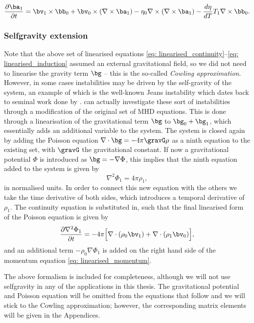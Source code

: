 {\begin{equation} \label{eq: linearised_induction}
  \frac{\partial \ba_1}{\partial t} =
    \bv_1 \times \bb_0
    + \bv_0 \times \left(\nabla \times \ba_1\right)
    - \eta_0 \nabla \times \left(\nabla \times \ba_1\right)
    - \frac{d\eta}{dT}T_1 \nabla \times \bb_0.
\end{equation}
}


\subsubsection{Selfgravity extension}
Note that the above set of linearised equations \eqref{eq: linearised_continuity}--\eqref{eq: linearised_induction} assumed an external gravitational field, so we did not need to linearise the gravity term $\bg$ -- this is the so-called \emph{Cowling approximation}. However, in some cases instabilities may be driven by the self-gravity of the system, an example of which is the well-known Jeans instability which dates back to seminal work done by \citet{book_jeans}. {\legolas} can actually investigate these sort of instabilities through a modification of the original set of MHD equations. This is done through a linearisation of the gravitational term $\bg$ to $\bg_0 + \bg_1$, which essentially adds an additional variable to the system. The system is closed again by adding the Poisson equation $\nabla \cdot \bg = -4\pi \gravG \rho$ as a ninth equation to the existing set, with $\gravG$ the gravitational constant. If now a gravitational potential $\Phi$ is introduced as $\bg = -\nabla \Phi$, this implies that the ninth equation added to the system is given by
\begin{equation}
  \nabla^2\Phi_1 = 4\pi\rho_1,
\end{equation}
in normalised units. In order to connect this new equation with the others we take the time derivative of both sides, which introduces a temporal derivative of $\rho_1$. The continuity equation is substituted in, such that the final linearised form of the Poisson equation is given by
\begin{equation}
  \frac{\partial \nabla^2 \Phi_1}{\partial t} =
    -4\pi \Bigl[\nabla \cdot \left(\rho_0 \bv_1\right) + \nabla \cdot \left(\rho_1 \bv_0\right)\Bigr],
\end{equation}
and an additional term $-\rho_0 \nabla \Phi_1$ is added on the right hand side of the momentum equation \eqref{eq: linearised_momentum}.

The above formalism is included for completeness, although we will not use selfgravity in any of the applications in this thesis. The gravitational potential and Poisson equation will be omitted from the equations that follow and we will stick to the Cowling approximation; however, the corresponding matrix elements will be given in the Appendices.

